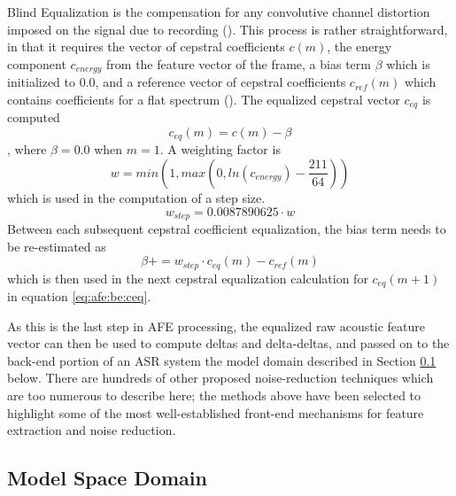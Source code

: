 \DIFaddend Blind Equalization is the compensation for any convolutive channel distortion imposed on the signal due to recording (\cite{mauuary:98}).  This process is rather straightforward, in that it requires the vector of cepstral coefficients $c(m)$, the energy component $c_{energy}$ from the feature vector of the frame, a bias term $\beta$ which is initialized to $0.0$, and a reference vector of cepstral coefficients $c_{ref}(m)$ which contains coefficients for a flat spectrum (\cite{etsi:02}).  The equalized cepstral vector $c_{eq}$ is computed \begin{equation}\label{eq:afe:be:ceq} c_{eq}(m) = c(m) - \beta \end{equation}, where $\beta = 0.0$ when $m = 1$.  A weighting factor is \DIFdelbegin {}\DIFdelend \DIFaddbegin {}\DIFaddend \begin{equation} w = min( 1 , max( 0 , ln(c_{energy}) - \dfrac{211}{64} ) ) \end{equation} which is used in the computation of a step size\DIFdelbegin {}\DIFdelend . \begin{equation}\label{eq:afe:be:step} w_{step} = 0.0087890625 \cdot w \end{equation}  Between each subsequent cepstral coefficient equalization, the bias term needs to be re-estimated as \begin{equation} \beta \mathrel{{+}{=}} w_{step} \cdot c_{eq}(m) - c_{ref}(m) \end{equation} which is then used in the next cepstral equalization calculation for $c_{eq}(m+1)$ in equation \ref{eq:afe:be:ceq}.

As this is the last step in AFE processing, the equalized raw acoustic feature vector can then be used to compute deltas and delta-deltas, and passed on to the back-end portion of an ASR system \DIFdelbegin \DIFdel{, }\DIFdelend \DIFaddbegin \DIFadd{- }\DIFaddend the model domain \DIFdelbegin \DIFdel{, }\DIFdelend \DIFaddbegin \DIFadd{- }\DIFaddend described in Section \ref{sec:model-domain} below.  There are hundreds of other proposed noise-reduction techniques which are too numerous to describe here; the methods above have been selected to highlight some of the most well-established front-end mechanisms for feature extraction and noise reduction.


\subsection{Model Space Domain}\label{sec:model-domain}


